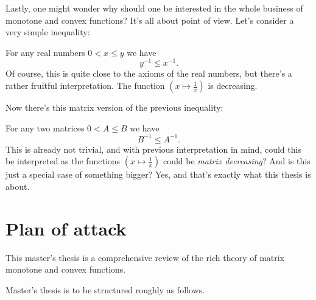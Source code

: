 Lastly, one might wonder why should one be interested in the whole business of monotone and convex functions? It's all about point of view. Let's consider a very simple inequality:

For any real numbers $0 < x \leq y$ we have
\[
	y^{-1} \leq x^{-1}.
\]
Of course, this is quite close to the axioms of the real numbers, but there's a rather fruitful interpretation. The function $(x \mapsto \frac{1}{x})$ is decreasing.

Now there's this matrix version of the previous inequality:

For any two matrices $0 < A \leq B$ we have
\[
	B^{-1} \leq A^{-1}.
\]
This is already not trivial, and with previous interpretation in mind, could this be interpreted as the functions $(x \mapsto \frac{1}{x})$ could be \textit{matrix decreasing}? And is this just a special case of something bigger? Yes, and that's exactly what this thesis is about.

\section{Plan of attack}

This master's thesis is a comprehensive review of the rich theory of matrix monotone and convex functions.

Master's thesis is to be structured roughly as follows.

